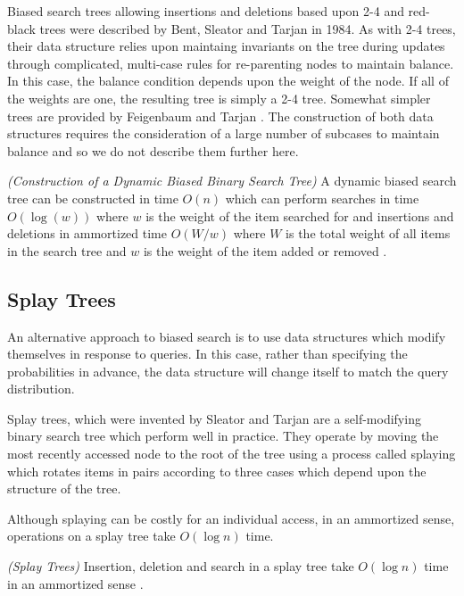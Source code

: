 \documentclass[mcs]{scsthesis}
\begin{document}
Biased search trees allowing insertions and deletions based upon 2-4 and
red-black trees were described by Bent, Sleator and Tarjan \cite{bst} in 1984.
As with 2-4 trees, their data structure relies upon maintaing invariants
on the tree during updates through complicated, multi-case rules for
re-parenting nodes to maintain balance. In this case, the balance condition
depends upon the weight of the node. If all of the weights are one, the
resulting tree is simply a 2-4 tree. Somewhat simpler trees are provided
by Feigenbaum and Tarjan \cite{bst2}. The construction of both data structures
requires the consideration of a large number of subcases to maintain balance and
so we do not describe them further here.

\begin{thm} \emph{(Construction of a Dynamic Biased Binary Search Tree)} 
A dynamic biased search tree can be constructed in time \(O(n)\) which can
perform searches in time \(O(\log(w))\) where \(w\) is the weight of the item
searched for and insertions and deletions in ammortized time \(O(W / w)\)
where \(W\) is the total weight of all items in the search tree and \(w\) is
the weight of the item added or removed \cite{bst2}.
\end{thm}

\subsection{Splay Trees}

An alternative approach to biased search is to use data structures which
modify themselves in response to queries. In this case, rather than specifying
the probabilities in advance, the data structure will change itself to match
the query distribution. 

Splay trees, which were invented by Sleator and Tarjan \cite{splaytree} are a
self-modifying binary search tree which perform well in practice. They operate
by moving the most recently accessed node to the root of the tree using a
process called splaying which rotates items in pairs according to three cases
which depend upon the structure of the tree.

Although splaying can be costly for an individual access, in an ammortized
sense, operations on a splay tree take \(O(\log n)\) time.

\begin{thm} \emph{(Splay Trees)} 
Insertion, deletion and search in a splay tree take \(O(\log n)\) time in
an ammortized sense \cite{splaytree}.
\end{thm}
\end{document}
